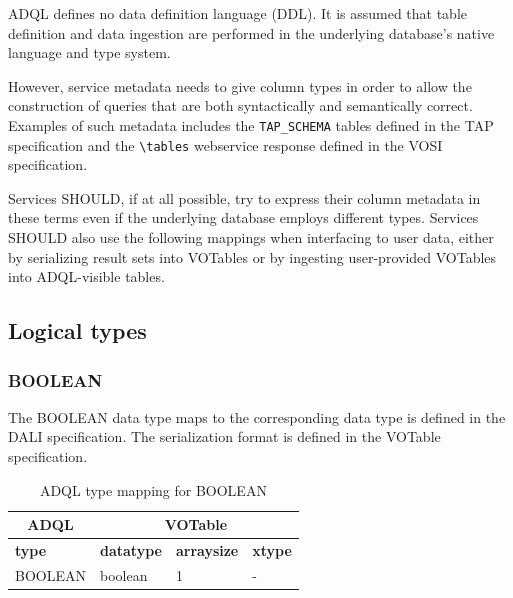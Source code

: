 \documentclass[11pt,a4paper]{ivoa}
\newcommand{\VOTspec}{VOTable specification\xspace}
\newcommand{\TAPspec}{TAP specification\xspace}
\newcommand{\DALIspec}{DALI specification\xspace}
\newcommand{\VOSIspec}{VOSI specification\xspace}
\begin{document}
ADQL defines no data definition language (DDL).
It is assumed that table definition and data ingestion are performed in
the underlying database's native language and type system.

However, service metadata needs to give column types in order to allow the
construction of queries that are both syntactically and semantically correct.
Examples of such metadata includes the \verb:TAP_SCHEMA: tables defined
in the \TAPspec and the \verb:\tables:
webservice response defined in the \VOSIspec.

Services SHOULD, if at all possible, try to express their column metadata in
these terms even if the underlying database employs different types.
Services SHOULD also use the following mappings when interfacing to user data,
either by serializing result sets into VOTables or by ingesting user-provided
VOTables into ADQL-visible tables.

\subsection{Logical types}
\label{sec:types.logical}
\subsubsection{BOOLEAN}
\label{sec:types.logical.boolean}

The BOOLEAN data type maps to the corresponding data type is defined in the \DALIspec.
The serialization format is defined in the \VOTspec.

\begin{table}[thm]\footnotesize
    \begin{tabular}
        {|p{}|p{}|p{}|p{}|}
        \hline

        \hline
        \multicolumn{1}{|c|}{\textbf{ADQL}} &
        \multicolumn{3}{|c|}{\textbf{VOTable}}
        \tabularnewline
        
        \hline
        \textbf{type} &
        \textbf{datatype} &
        \textbf{arraysize} &
        \textbf{xtype}
        \tabularnewline

        \hline
        BOOLEAN &
        boolean &
        1 &
        -
        \tabularnewline

        \hline
    \end{tabular}
    \caption{ADQL type mapping for BOOLEAN}
    \label{table:types.logical.boolean}
\end{table}
\end{document}
